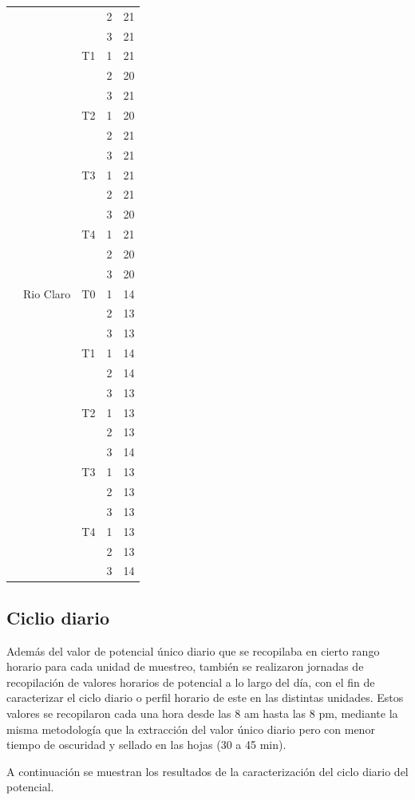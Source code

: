 \documentclass[
  letterpaper,
  DIV=11,
  numbers=noendperiod]{scrreprt}
\begin{document}
\begin{longtable}[]{@{}llllr@{}}
& & & 2 & 21 \\
& & & 3 & 21 \\
& & T1 & 1 & 21 \\
& & & 2 & 20 \\
& & & 3 & 21 \\
& & T2 & 1 & 20 \\
& & & 2 & 21 \\
& & & 3 & 21 \\
& & T3 & 1 & 21 \\
& & & 2 & 21 \\
& & & 3 & 20 \\
& & T4 & 1 & 21 \\
& & & 2 & 20 \\
& & & 3 & 20 \\
& Rio Claro & T0 & 1 & 14 \\
& & & 2 & 13 \\
& & & 3 & 13 \\
& & T1 & 1 & 14 \\
& & & 2 & 14 \\
& & & 3 & 13 \\
& & T2 & 1 & 13 \\
& & & 2 & 13 \\
& & & 3 & 14 \\
& & T3 & 1 & 13 \\
& & & 2 & 13 \\
& & & 3 & 13 \\
& & T4 & 1 & 13 \\
& & & 2 & 13 \\
& & & 3 & 14 \\
\end{longtable}

\subsection{Ciclio diario}\label{ciclio-diario}

Además del valor de potencial único diario que se recopilaba en cierto
rango horario para cada unidad de muestreo, también se realizaron
jornadas de recopilación de valores horarios de potencial a lo largo del
día, con el fin de caracterizar el ciclo diario o perfil horario de este
en las distintas unidades. Estos valores se recopilaron cada una hora
desde las 8 am hasta las 8 pm, mediante la misma metodología que la
extracción del valor único diario pero con menor tiempo de oscuridad y
sellado en las hojas (30 a 45 min).

A continuación se muestran los resultados de la caracterización del
ciclo diario del potencial.
\end{document}
